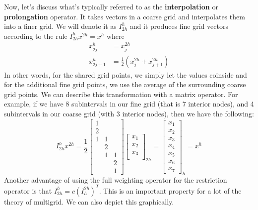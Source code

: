 \documentclass[11pt]{article}
\begin{document}
Now, let's discuss what's typically referred to as the
\textbf{interpolation} or \textbf{prolongation} operator. It takes
vectors in a coarse grid and interpolates them into a finer grid. We
will denote it as \(I_{2h}^h\) and it produces fine grid vectors
according to the rule \(I_{2h}^h x^{2h} = x^{h}\) where \begin{align*}
x_{2j}^h &= x_j^{2h} \\
x_{2j+1}^h &= \frac{1}{2} \left( x_j^{2h} + x_{j+1}^{2h} \right)
\end{align*} In other words, for the shared grid points, we simply let
the values coinside and for the additional fine grid points, we use the
average of the surrounding coarse grid points. We can describe this
transformation with a matrix operator. For example, if we have 8
subintervals in our fine grid (that is 7 interior nodes), and 4
subintervals in our coarse grid (with 3 interior nodes), then we have
the following: \[
I_{2h}^h x^{2h} = \frac{1}{2} 
\begin{bmatrix}
1 & & \\
2 & & \\
1 & 1 & \\
& 2 & \\
& 1 & 1 \\
& & 2 \\
& & 1
\end{bmatrix}
\begin{bmatrix}
x_1 \\ x_2 \\ x_3 \\
\end{bmatrix}_{2h}
= \begin{bmatrix}
x_1 \\ x_2 \\ x_3 \\ x_4 \\ x_5 \\ x_6 \\ x_7
\end{bmatrix}_h = x^h
\] Another advantage of using the full weighting operator for the
restriction operator is that \(I_{2h}^h = c(I_h^{2h})^T\). This is an
important property for a lot of the theory of multigrid. We can also
depict this graphically.
\end{document}
